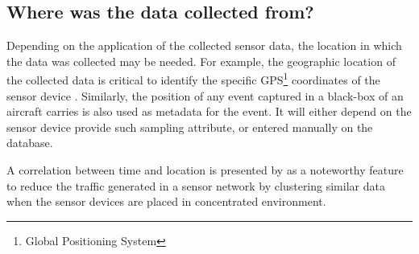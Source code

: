 \subsection{Where was the data collected from?}

Depending on the application of the collected sensor data, the location in
which the data was collected may be needed. For example, the geographic
location of the collected data is critical to identify the specific
GPS\footnote{Global Positioning System} coordinates of the sensor device
\cite{sn-ex02}. Similarly, the position of any  event captured in a black-box
of an aircraft carries is also used as metadata for the event. It will either
depend on the sensor device provide such sampling attribute, or entered
manually on the database.

A correlation between time and location is presented by \cite{sn-time-series}
as a noteworthy feature to reduce the traffic generated in a sensor network by
clustering similar data when the sensor devices are placed in concentrated 
environment.
